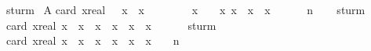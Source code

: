 \begin{isabellebody}
\ sturm%
\endisatagproof
{\isafoldproof}%
%
\isadelimproof
%
\endisadelimproof
\isanewline
\isanewline
{}\isamarkupfalse%
\ A{\isacharcolon}\isanewline
{\isachardoublequoteopen}card\ {\isacharbraceleft}x{\isacharcolon}{\isacharcolon}real{\isachardot}\ {\isacharminus}{}{\isachardot}{}{}{}{}{}{}\ {\isacharless}\ x\ {\isasymand}\ x\ {\isacharless}\ {}{\isachardot}{}{}{}{}{}{}\ {\isasymand}\ \isanewline
\ \ \ \ {}{\isacharslash}{}{}{}{\isacharasterisk}x{\isacharcircum}{}\ {\isacharplus}\ {}{\isacharslash}{}{}\ {\isacharasterisk}\ x{\isacharcircum}{}\ {\isacharplus}{}{\isacharslash}{}{\isacharasterisk}x{\isacharcircum}{}\ {\isacharminus}\ {}{}{\isacharslash}{}{}{}{}{}{}{}{}{\isacharasterisk}x{\isacharcircum}{}\ {\isacharminus}\ {}{}{\isacharslash}{}{}{}{}{}{}{}{\isacharasterisk}x\ {\isacharequal}\ {}{\isacharbraceright}\ \isanewline
\ \ {\isacharequal}\ {\isacharquery}n{\isachardoublequoteclose}\isanewline
%
\isadelimproof
\ \ %
\endisadelimproof
%
\isatagproof
{}\isamarkupfalse%
\ sturm%
\endisatagproof
{\isafoldproof}%
%
\isadelimproof
\isanewline
%
\endisadelimproof
\isanewline
{}\isamarkupfalse%
\ {\isachardoublequoteopen}card\ {\isacharbraceleft}x{\isacharcolon}{\isacharcolon}real{\isachardot}\ x{\isacharcircum}{}\ {\isacharplus}\ x\ {\isacharequal}\ {}{\isacharasterisk}x{\isacharcircum}{}\ {\isasymand}\ x{\isacharcircum}{}\ {\isacharminus}\ {}{\isacharasterisk}x{\isacharcircum}{}\ {\isacharplus}\ {}{}{\isacharasterisk}x\ {\isacharequal}\ {}{\isacharbraceright}\ {\isacharequal}\ {}{\isachardoublequoteclose}\ \isanewline
%
\isadelimproof
%
\endisadelimproof
%
\isatagproof
{}\isamarkupfalse%
\ sturm%
\endisatagproof
{\isafoldproof}%
%
\isadelimproof
\isanewline
%
\endisadelimproof
\isanewline
\isanewline
\isanewline
{}\isamarkupfalse%
\ {\isachardoublequoteopen}card\ {\isacharbraceleft}x{\isacharcolon}{\isacharcolon}real{\isachardot}\ x{\isacharcircum}{}\ {\isacharplus}\ x\ {\isacharequal}\ {}{\isacharasterisk}x{\isacharcircum}{}\ {\isasymor}\ x{\isacharcircum}{}\ {\isacharminus}\ {}{\isacharasterisk}x{\isacharcircum}{}\ {\isacharplus}\ {}{}{\isacharasterisk}x\ {\isacharequal}\ {}{\isacharbraceright}\ {\isacharequal}\ {\isacharquery}n{\isachardoublequoteclose}%

\end{isabellebody}
